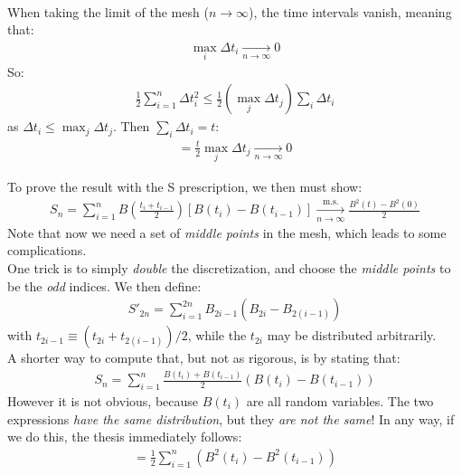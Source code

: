 \documentclass[../template.tex]{subfiles}
\begin{document}
\begin{example}[a]
\begin{align*}
    \end{align*}  
    When taking the limit of the mesh ($n \to \infty$), the time intervals vanish, meaning that:
    \begin{align*}
        \max_{i} \Delta t_i  \xrightarrow[n \to \infty]{}  0
    \end{align*}
    So:
    \begin{align*}
        \frac{1}{2} \sum_{i=1}^n \Delta t_i^2 \leq \frac{1}{2} \left(\max_j \Delta t_j\right) \sum_i \Delta t_i  
    \end{align*}
    as $\Delta t_i \leq \max_j \Delta t_j$. Then $\sum_i \Delta t_i = t$: 
    \begin{align*}
        = \frac{t}{2} \max_{j} \Delta t_j  \xrightarrow[n \to \infty]{}  0
    \end{align*} 


    To prove the result with the S prescription, we then must show:
    \begin{align*}
        S_n = \sum_{i=1}^n B\left(\frac{t_i + t_{i-1}}{2} \right)[B(t_i) - B(t_{i-1})]  \xrightarrow[n \to \infty]{\mathrm{m.s.} } \frac{B^2(t) - B^2(0)}{2}   
    \end{align*}
    Note that now we need a set of \textit{middle points} in the mesh, which leads to some complications.\\
    One trick is to simply \textit{double} the discretization, and choose the \textit{middle points} to be the \textit{odd} indices. We then define:
    \begin{align*}
        S'_{2n}  = \sum_{i=1}^{2n} B_{2i -1} (B_{2i} - B_{2(i-1)}) 
    \end{align*}  
    with $t_{2i - 1} \equiv (t_{2i} + t_{2(i-1)})/2$, while the $t_{2i}$ may be distributed arbitrarily.\\
    
    A shorter way to compute that, but not as rigorous, is by stating that:
    \begin{align*}
        S_n = \sum_{i=1}^n \frac{B(t_i) + B(t_{i-1})}{2} (B(t_i)-B(t_{i-1})) 
    \end{align*}
    However it is not obvious, because $B(t_i)$ are all random variables. The two expressions \textit{have the same distribution}, but they \textit{are not the same}! In any way, if we do this, the thesis immediately follows:
    \begin{align*}
        = \frac{1}{2} \sum_{i=1}^n (B^2(t_i) - B^2(t_{i-1})) 
    \end{align*}   
\end{example}
\end{document}
